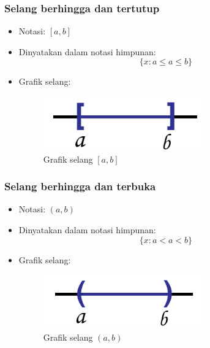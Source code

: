 \documentclass[pdflatex,compress,mathserif]{beamer}
\begin{document}
		\begin{frame}
			\frametitle{Selang berhingga dan tertutup}
			\begin{itemize}
				\item Notasi: $ [a,b] $
				\item Dinyatakan dalam notasi himpunan:
				\begin{equation}
					\{x:a \leq a \leq b\}
				\end{equation}
				\item Grafik selang:
				\begin{figure}
					\centering
					\includegraphics[width=0.5\linewidth]{pict/02}
					\caption{Grafik selang $[a,b]$}
					\label{fig:02}
				\end{figure}
			\end{itemize}
		\end{frame}
	
		\begin{frame}
			\frametitle{Selang berhingga dan terbuka}
			\begin{itemize}
				\item Notasi: $ (a,b) $
				\item Dinyatakan dalam notasi himpunan:
				\begin{equation}
					\{x:a < a < b\}
				\end{equation}
				\item Grafik selang:
				\begin{figure}
					\centering
					\includegraphics[width=0.5\linewidth]{pict/03}
					\caption{Grafik selang $(a,b)$}
					\label{fig:03}
				\end{figure}
			\end{itemize}
		\end{frame}
	
\end{document}

